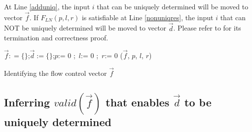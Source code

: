 At Line \ref{adduniq},
the input $i$ that can be uniquely determined will be moved to vector $\vec{f}$.
If $F_{LN}(p,l,r)$ is satisfiable at Line \ref{nonuniqres},
the input $i$ that can NOT be uniquely determined will be moved to vector $\vec{d}$.
Please refer to \cite{QinTODAES15} for its termination and correctness proof.

\begin{algorithm}[t]
\SetAlgoVlined
{}
$\vec{f}: = \{\}$;$\vec{d}:= \{\}$;$p$:= 0 ;~$l$:= 0 ;~$r$:= 0 \;
\KwRet ($\vec{f}$, $p$, $l$, $r$)
\caption{Identifying the flow control vector $\vec{f}$}
\label{alg_fofc}
\end{algorithm}







\subsection{Inferring $valid(\vec{f})$ that enables $\vec{d}$ to be uniquely determined}\label{subsec_infer}

